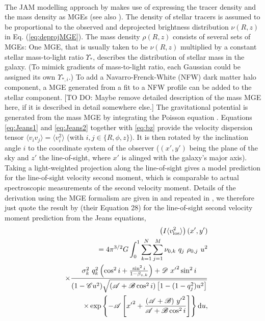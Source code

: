 \\The JAM modelling approach by \citet{Cap08} makes use of expressing the tracer density and the mass density as MGEs (see also \citet{1994A&A...285..723E}). The density of stellar tracers is assumed to be proportional to the observed and deprojected brightness distribution $\nu(R,z)$ in Eq. (\ref{eq:deprojMGE}). The mass density $\rho(R,z)$ consists of several sets of MGEs: One MGE, that is usually taken to be $\nu(R,z)$ multiplied by a constant stellar mass-to-light ratio $\Upsilon_*$, describes the distribution of stellar mass in the galaxy. (To mimick gradients of mass-to-light ratio, each Gaussian could be assigned its own $\Upsilon_{*,i}$.) To add a Navarro-Frenck-White (NFW) \citep{Navarro+1995c,NFW96} dark matter halo component, a MGE generated from a fit to a NFW profile can be added to the stellar component. [TO DO: Maybe remove detailed description of the mass MGE here, if it is described in detail somewhere else.] The gravitational potential is generated from the mass MGE by integrating the Poisson equation \citep{1994A&A...285..723E}. Equations \ref{eq:Jeans1} and \ref{eq:Jeans2} together with \ref{eq:bz} provide the velocity dispersion tensor $\langle v_i v_j \rangle = \langle v_i^2 \rangle$ (with $i,j \in \{ R,\phi, z\}$). It is then rotated by the inclination angle $i$ to the coordinate system of the observer ($(x',y')$ being the plane of the sky and $z'$ the line-of-sight, where $x'$ is alinged with the galaxy's major axis). Taking a light-weighted projection along the line-of-sight gives a model prediction for the line-of-sight velocity second moment, which is comparable to actual spectroscopic measurements of the second velocity moment. Details of the derivation using the MGE formalism are given in \citet{Cap08} and repeated in \citet{GlennEC}, we therefore just quote the result by \citet{Cap08} (their Equation 28) for the line-of-sight second velocity moment prediction from the Jeans equations,
\begin{eqnarray}
&&\left(I \langle v_\text{los}^2\rangle\right)(x',y')\\
&&= 4 \pi^{3/2} G \int_0^1 \sum_{k=1}^N \sum_{j=1}^M \nu_{0,k} \ q_j \ \rho_{0,j} \ u^2\nonumber\\
&& \times \frac{\sigma_k^2 \ q^{2}_k \left( \cos^2 i + \frac{\sin^2 i}{1-\beta_{z,k}}\right) + \mathscr{D} \  {x'}^{2} \sin^2 i}{(1-\mathscr{C}u^2) \sqrt{(\mathscr{A} + \mathscr{B} \cos^2 i) \left[1-(1-q^{2}_j) u^2 \right]}}\label{eq:explicitLOSvelCap}\\
&& \times \exp\left\{- \mathscr{A} \left[{x'}^{2} + \frac{(\mathscr{A}+\mathscr{B}) \ {y'}^{2}}{\mathscr{A}+\mathscr{B}\cos^2 i}\right] \right\} \diff u, \\
\end{eqnarray}
